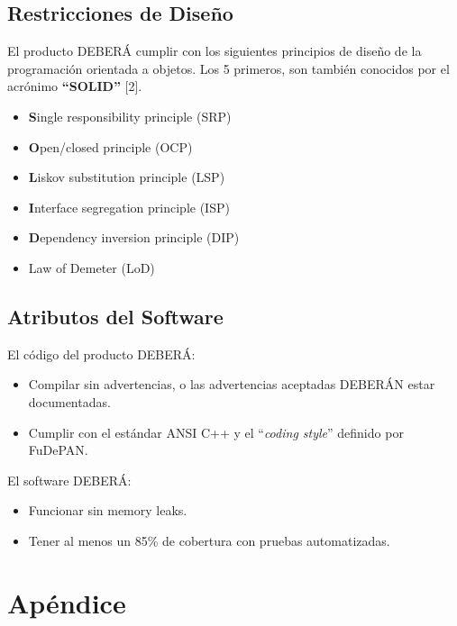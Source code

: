 \documentclass[12pt,a4paper,english,spanish]{article}
\begin{document}
\subsection{Restricciones de Diseño}
\par El producto DEBERÁ cumplir con los siguientes principios de diseño de la
programación orientada a objetos. Los 5 primeros, son también conocidos por
el acrónimo \textbf{``SOLID''} [2].
\begin{itemize}
	\item \textbf{S}ingle responsibility principle (SRP)
	\item \textbf{O}pen/closed principle (OCP)
	\item \textbf{L}iskov substitution principle (LSP)
	\item \textbf{I}nterface segregation principle (ISP)
	\item \textbf{D}ependency inversion principle (DIP)	
	\item Law of Demeter (LoD)
\end{itemize}

\subsection{Atributos del Software}
\par El código del producto DEBERÁ:
\begin{itemize}
 \item Compilar sin advertencias, o las advertencias aceptadas DEBERÁN estar documentadas.
 \item Cumplir con el estándar ANSI C++ y el ``\textit{coding style}'' definido por FuDePAN.
\end{itemize}
\par El software DEBERÁ:
\begin{itemize}
	\item Funcionar sin memory leaks.
	\item Tener al menos un 85\% de cobertura con pruebas automatizadas.
\end{itemize}

\section{Apéndice}
\end{document}

